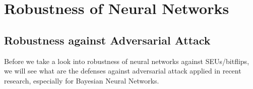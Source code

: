 \documentclass[ %
                    author={Revalda Putawara},
                supervisor={Dr. James Pope},
                    degree={MSc},
                     title={Robustness of Bayesian Neural Networks Design Choices Against Weight and Bias Perturbation Induced by Single Event Upsets (SEUs)},
                      type={},
                      year={2025}]{dissertation}
\begin{document}

\section{Robustness of Neural Networks}


\subsection{Robustness against Adversarial Attack}

Before we take a look into robustness of neural networks against SEUs/bitflips, we will see what are the defenses against adversarial attack applied in recent research, especially for Bayesian Neural Networks.

\end{document}
